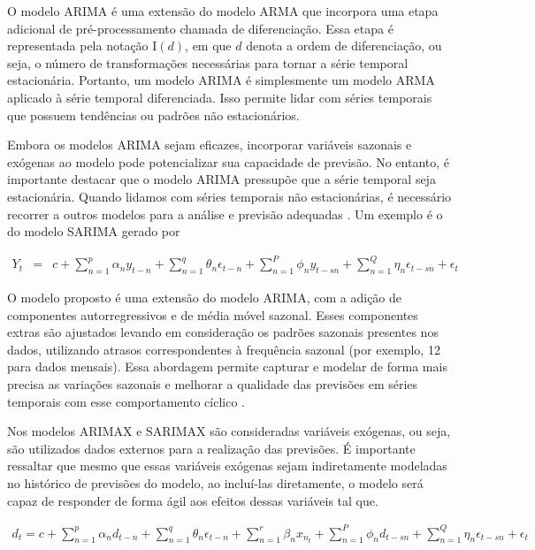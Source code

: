  O modelo ARIMA é uma extensão do modelo ARMA que incorpora uma etapa adicional de pré-processamento chamada de diferenciação. Essa etapa é representada pela notação I$(d)$, em que $d$ denota a ordem de diferenciação, ou seja, o número de transformações necessárias para tornar a série temporal estacionária. Portanto, um modelo ARIMA é simplesmente um modelo ARMA aplicado à série temporal diferenciada. Isso permite lidar com séries temporais que possuem tendências ou padrões não estacionários.
 
 Embora os modelos ARIMA sejam eficazes, incorporar variáveis sazonais e exógenas ao modelo pode potencializar sua capacidade de previsão. No entanto, é importante destacar que o modelo ARIMA pressupõe que a série temporal seja estacionária. Quando lidamos com séries temporais não estacionárias, é necessário recorrer a outros modelos para a análise e previsão adequadas  \cite{arima}. Um exemplo é o do modelo SARIMA gerado por
 
 \begin{eqnarray}
 	Y_t&=&c+\sum_{n=1}^p \alpha_n y_{t-n}+\sum_{n=1}^q \theta_n \epsilon_{t-n}+\sum_{n=1}^P \phi_n y_{t-s n}+\sum_{n=1}^Q \eta_n \epsilon_{t-s n}+\epsilon_t \label{sarima}
 \end{eqnarray}
 
 O modelo proposto é uma extensão do modelo ARIMA, com a adição de componentes autorregressivos e de média móvel sazonal. Esses componentes extras são ajustados levando em consideração os padrões sazonais presentes nos dados, utilizando atrasos correspondentes à frequência sazonal (por exemplo, 12 para dados mensais). Essa abordagem permite capturar e modelar de forma mais precisa as variações sazonais e melhorar a qualidade das previsões em séries temporais com esse comportamento cíclico \cite{sarima}.
 
 Nos modelos ARIMAX e SARIMAX são consideradas variáveis exógenas, ou seja, são utilizados dados externos para a realização das previsões. É importante ressaltar que mesmo que essas variáveis exógenas sejam indiretamente modeladas no histórico de previsões do modelo, ao incluí-las diretamente, o modelo será capaz de responder de forma ágil aos efeitos dessas variáveis \cite{sarima} tal que.
 
 \begin{eqnarray}
 	d_t=c+\sum_{n=1}^p \alpha_n d_{t-n}+\sum_{n=1}^q \theta_n \epsilon_{t-n}+\sum_{n=1}^r \beta_n x_{n_t}+\sum_{n=1}^P \phi_n d_{t-s n}+\sum_{n=1}^Q \eta_n \epsilon_{t-s n}+\epsilon_t \label{eq:sarmax}
 \end{eqnarray}
 
